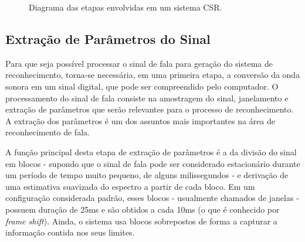 \documentclass[12pt,a4paper,oneside]{report}
\begin{document}
\begin{figure}[h!]
\centering
{}\caption{Diagrama das etapas envolvidas em um sistema CSR.}
\label{fig:CSR}
\end{figure}

\subsection{Extração de Parâmetros do Sinal}

Para que seja possível processar o sinal de fala para geração do sistema de reconhecimento, torna-se necessária, em uma primeira etapa, a conversão da onda sonora em um sinal digital, que pode ser compreendido pelo computador. O processamento do sinal de fala consiste na amostragem do sinal, janelamento e extração de parâmetros que serão relevantes para o processo de reconhecimento. A extração dos parâmetros é um dos assuntos mais importantes na área de reconhecimento de fala.

A função principal desta etapa de extração de parâmetros é a da divisão do sinal em blocos - supondo que o sinal de fala pode ser considerado estacionário durante um período de tempo muito pequeno, de alguns milissegundos - e derivação de uma estimativa suavizada do espectro a partir de cada bloco. Em um configuração considerada padrão, esses blocos - usualmente chamados de janelas - possuem duração de 25ms e são obtidos a cada 10ms (o que é conhecido por \emph{frame shift}). Ainda, o sistema usa blocos sobrepostos de forma a capturar a informação contida nos seus limites.
\end{document}
